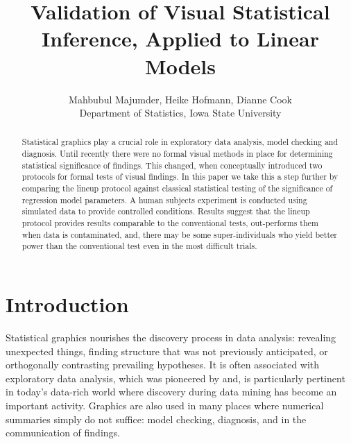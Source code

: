 \documentclass{article}
\begin{document}
\title{Validation of Visual Statistical Inference, Applied to Linear Models}
\author{Mahbubul Majumder, Heike Hofmann, Dianne Cook\\
        Department of Statistics, Iowa State University}
\maketitle

\begin {abstract}  
Statistical graphics play a crucial role in exploratory data analysis, model checking and diagnosis. Until recently there were no formal visual methods in place for determining statistical significance of findings. This changed, when \citet{buja:2009} conceptually introduced two protocols for formal tests of visual findings. In this paper we take this a step further by comparing the lineup protocol \citep{buja:2009} against classical statistical testing  of the significance of regression model parameters. A human subjects experiment is conducted using simulated data to provide controlled conditions. Results suggest that the lineup protocol provides results comparable to the conventional tests, out-performs them when data is contaminated, and, there may be some super-individuals who yield better power than the conventional test even in the most difficult trials.
\end {abstract}


\section{Introduction} 


Statistical graphics nourishes the discovery process in data analysis: revealing unexpected things,  finding structure that was not previously anticipated,  or orthogonally contrasting prevailing hypotheses. It is often associated with exploratory data analysis, which was pioneered by \cite{tukey:eda} and, is particularly pertinent in today's data-rich world where discovery during data mining has become an important activity. Graphics are also used in many places where numerical summaries simply do not suffice: model checking, diagnosis, and in the communication of findings. 
\end{document}
